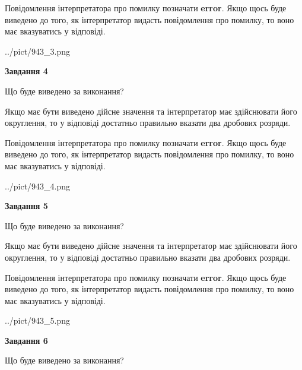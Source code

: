 \documentclass[12pt, ukrainian]{article}
\begin{document}
{\begin {Large}
Повідомлення інтерпретатора про помилку позначати \textbf{error}.
Якщо щось буде виведено до того, як інтерпретатор видасть повідомлення про помилку, 
то воно має вказуватись у відповіді. \par

\begin{center}
	{../pict/943_3.png}
\end{center}
\newpage

{\begin {center}\textbf{Завдання 4}\end {center}}\par
Що буде виведено за виконання? \par

Якщо має бути виведено дійсне значення та інтерпретатор має здійснювати його округлення, 
то у відповіді достатньо правильно вказати два дробових розряди.

Повідомлення інтерпретатора про помилку позначати \textbf{error}.
Якщо щось буде виведено до того, як інтерпретатор видасть повідомлення про помилку, 
то воно має вказуватись у відповіді. \par

\begin{center}
	{../pict/943_4.png}
\end{center}
\newpage

{\begin {center}\textbf{Завдання 5}\end {center}}\par
Що буде виведено за виконання? \par

Якщо має бути виведено дійсне значення та інтерпретатор має здійснювати його округлення, 
то у відповіді достатньо правильно вказати два дробових розряди.

Повідомлення інтерпретатора про помилку позначати \textbf{error}.
Якщо щось буде виведено до того, як інтерпретатор видасть повідомлення про помилку, 
то воно має вказуватись у відповіді. \par

\begin{center}
	{../pict/943_5.png}
\end{center}
\newpage

{\begin {center}\textbf{Завдання 6}\end {center}}\par
Що буде виведено за виконання? \par


\end{Large}}
\end{document}
